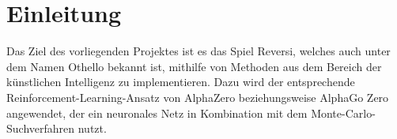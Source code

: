 \section{Einleitung}
Das Ziel des vorliegenden Projektes ist es das Spiel \glqq{}Reversi\grqq{}, welches auch unter dem Namen \glqq{}Othello\grqq{} bekannt ist, mithilfe von Methoden aus dem Bereich der künstlichen Intelligenz zu implementieren. Dazu wird der entsprechende Reinforcement-Learning-Ansatz von AlphaZero beziehungsweise AlphaGo Zero angewendet, der ein neuronales Netz in Kombination mit dem Monte-Carlo-Suchverfahren nutzt.



